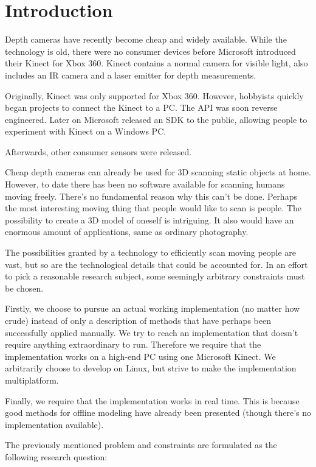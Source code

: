 \chapter{Introduction}

 Depth cameras have recently become cheap and widely available. While the technology is old, there were no consumer devices before Microsoft introduced their Kinect for Xbox 360. Kinect contains a normal camera for visible light,  also includes an IR camera and a laser emitter for depth measurements. 

Originally, Kinect was only supported for Xbox 360. However, hobbyists quickly began projects to connect the Kinect to a PC. The API was soon reverse engineered. Later on Microsoft released an SDK to the public, allowing people to experiment with Kinect on a Windows PC.

Afterwards, other consumer sensors were released. 

Cheap depth cameras can already be used for 3D scanning static objects at home. However, to date there has been no software available for scanning humans moving freely. There's no fundamental reason why this can't be done. Perhaps the most interesting moving thing that people would like to scan is people. The possibility to create a 3D model of oneself is intriguing. It also would have an enormous amount of applications, same as ordinary photography.


The possibilities granted by a technology to efficiently scan moving people are vast, but so are the technological details that could be accounted for. In an effort to pick a reasonable research subject, some seemingly arbitrary constraints must be chosen.

Firstly, we choose to pursue an actual working implementation (no matter how crude) instead of only a description of methods that have perhaps been successfully applied manually. We try to reach an implementation that doesn't require anything extraordinary to run. Therefore we require that the implementation works on a high-end PC using one Microsoft Kinect. We arbitrarily choose to develop on Linux, but strive to make the implementation multiplatform.

Finally, we require that the implementation works in real time. This is because good methods for offline modeling have already been presented (though there's no implementation available).

The previously mentioned problem and constraints are formulated as the following research question:

